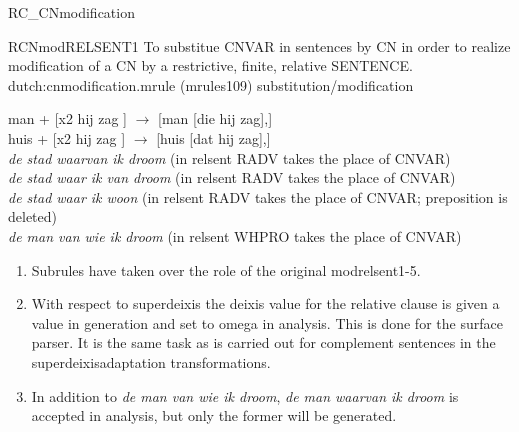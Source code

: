 \begin{mruleclass}{RC\_CNmodification}
\begin{members}
\begin{member}
 RCNmodRELSENT1
 To substitue CNVAR in sentences by CN in order to realize 
modification of a CN by a restrictive, finite, relative SENTENCE.
\file dutch:cnmodification.mrule (mrules109)
\semantics substitution/modification 
\example\mbox{}
 
man + [x2 hij zag ] $\rightarrow$ [man [die hij zag],]\\
huis + [x2 hij zag ] $\rightarrow$ [huis [dat hij zag],]\\
{\em de stad waarvan ik droom} (in relsent RADV takes the place of CNVAR)\\
{\em de stad waar ik van droom} (in relsent RADV takes the place of CNVAR)\\
{\em de stad waar ik woon} (in relsent RADV takes the place of CNVAR; 
preposition is deleted)\\
{\em de man van wie ik droom} (in relsent WHPRO takes the place of CNVAR)\\

\remarks
\begin{enumerate}
\item 
Subrules have taken over the role of the original modrelsent1-5. 
\item 
With respect to superdeixis 
the deixis value for the relative clause is given a value in 
generation and set to omega in analysis. This is done for the surface parser. 
It is the same task as is carried out for complement sentences in the 
superdeixisadaptation transformations.\\
\item 
In addition to {\em de man van wie ik droom}, 
{\em de man waarvan ik droom} is accepted in analysis, but only the former
will be  generated.

\end{enumerate}

\end{member}


\end{members}
\end{mruleclass}
